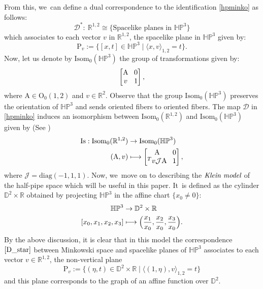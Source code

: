 \documentclass[10pt]{amsart}
\newcommand\mto{\mathchoice{\longmapsto}{\mapsto}{\mapsto}{\mapsto}}
\theoremstyle{plain}
\theoremstyle{definition}
\newcommand{\minko}{\mathbb{R}^{1,2}}
\newcommand{\HP}{\mathbb{HP}^3}
\newcommand{\isom}{\mathrm{Isom}_0}
\newcommand{\inner}[1] {\langle #1 \rangle}
\begin{document}
From this, we~can define a dual correspondence to the identification \eqref{hpminko} as follows:
\begin{equation}\label{D_star}
\mathcal{D}^*: \ \minko\cong\{\text{Spacelike planes in } \HP \}
\end{equation}
which associates to each vector $v$ in $\minko$, the spacelike plane in $\HP$ given by:
\[
\mathrm{P}_v:=\{[x,t]\in\HP \mid \inner{x,v}_{1,2}=t \}.
\]
Now, let us denote by $\isom(\HP)$ the group of transformations given by:
\[\arraycolsep4pt
\begin{bmatrix}
\mathrm{A} & 0 \\
v & 1
\end{bmatrix},
\]
where $\mathrm{A}\in \mathrm{O}_{0}(1,2)$ and $v\in \mathbb{R}^2$. Observe that the group $\isom(\HP)$ preserves the orientation of $\HP$ and sends oriented fibers to oriented fibers. The map $\mathcal{D}$ in \eqref{hpminko} induces an isomorphism between
$\isom(\mathbb{R}^{1,2})$ and $\isom(\HP)$ given by (See \cite[\S 2.8]{riolo_seppi})
\begin{equation}\label{groupeduality}
\begin{aligned}
\mathrm{Is}:\isom(\mathbb{R}^{1,2}) & \to \isom(\HP) \\
(\mathrm{A},v) & \mto\arraycolsep4pt \begin{bmatrix}
\mathrm{A} & 0 \\
^T v\mathcal{J}\mathrm{A} & 1
\end{bmatrix},
\end{aligned}
\end{equation}
where $\mathcal{J}=\mathrm{diag}(-1,1,1)$.
Now, we~move on to describing the $\emph{Klein model}$ of the half-pipe space which will be useful in this paper. It~is defined as the cylinder $\mathbb{D}^2\times\mathbb{R}$ obtained by projecting $\HP$ in the affine chart $\{x_0\neq 0\}$:
\begin{equation}\label{7}
\begin{aligned}
\HP & \to \mathbb{D}^2\times\mathbb{R} \\
[x_0,x_1,x_2,x_3] & \mto \Bigl(\frac{x_1}{x_0},\frac{x_2}{x_0},\frac{x_3}{x_0}\Bigr).
\end{aligned}
\end{equation}
By the above discussion, it is clear that in this model the correspondence $\eqref{D_star}$ between Minkowski space and spacelike planes of $\HP$ associates to each vector $v\in\minko$, the non-vertical plane
\begin{equation}\label{formule_dual_plan}
\mathrm{P}_v:=\{(\eta,t)\in\mathbb{D}^2\times\mathbb{R} \mid \langle (1,\eta),v \rangle_{1,2}=t \}\end{equation} and this plane corresponds to the graph of an affine function over $\mathbb{D}^2$.
\end{document}
